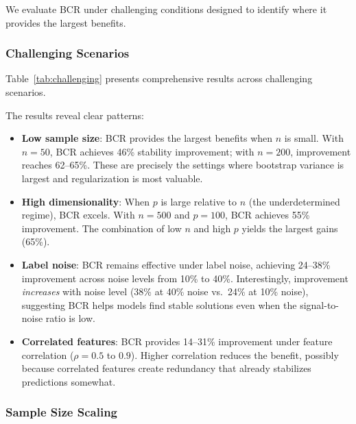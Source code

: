\documentclass[12pt, letterpaper]{article}
\begin{document}
We evaluate BCR under challenging conditions designed to identify where it provides the largest benefits.

\subsubsection{Challenging Scenarios}

Table~\ref{tab:challenging} presents comprehensive results across challenging scenarios.

\begin{table}[t]
\centering
\caption{BCR performance across challenging scenarios. Stability improvement shows percentage reduction in stability RMSE compared to baseline ERM.}
\label{tab:challenging}
\small

\end{table}

The results reveal clear patterns:

\begin{itemize}
\item \textbf{Low sample size}: BCR provides the largest benefits when $n$ is small. With $n=50$, BCR achieves 46\% stability improvement; with $n=200$, improvement reaches 62--65\%. These are precisely the settings where bootstrap variance is largest and regularization is most valuable.

\item \textbf{High dimensionality}: When $p$ is large relative to $n$ (the underdetermined regime), BCR excels. With $n=500$ and $p=100$, BCR achieves 55\% improvement. The combination of low $n$ and high $p$ yields the largest gains (65\%).

\item \textbf{Label noise}: BCR remains effective under label noise, achieving 24--38\% improvement across noise levels from 10\% to 40\%. Interestingly, improvement \emph{increases} with noise level (38\% at 40\% noise vs.\ 24\% at 10\% noise), suggesting BCR helps models find stable solutions even when the signal-to-noise ratio is low.

\item \textbf{Correlated features}: BCR provides 14--31\% improvement under feature correlation ($\rho=0.5$ to $0.9$). Higher correlation reduces the benefit, possibly because correlated features create redundancy that already stabilizes predictions somewhat.
\end{itemize}

\subsubsection{Sample Size Scaling}
\end{document}

